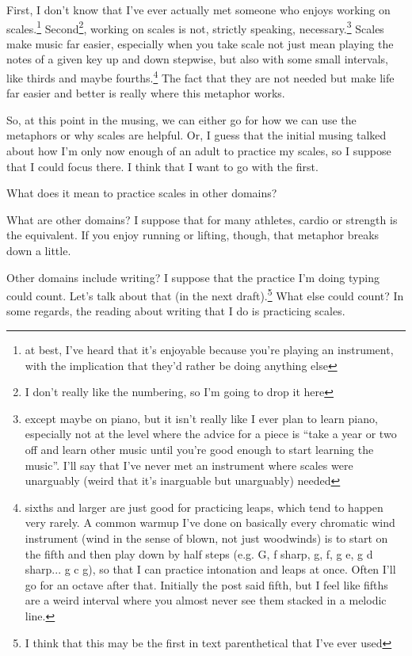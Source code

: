\documentclass[12pt]{article}[titlepage]
\newcommand{\say}[1]{``#1''}
\newcommand{\1}{\={a}}
\newcommand{\2}{\={e}}
\newcommand{\3}{\={\i}}
\newcommand{\4}{\=o}
\newcommand{\5}{\=u}
\newcommand{\6}{\={A}}
\renewcommand{\,}{\textsuperscript{,}}
\begin{document}
First, I don't know that I've ever actually met someone who enjoys working on scales.\footnote{at best, I've heard that it's enjoyable because you're playing an instrument, with the implication that they'd rather be doing anything else}
Second\footnote{I don't really like the numbering, so I'm going to drop it here}, working on scales is not, strictly speaking, necessary.\footnote{except maybe on piano, but it isn't really like I ever plan to learn piano, especially not at the level where the advice for a piece is \say{take a year or two off and learn other music until you're good enough to start learning the music}. I'll say that I've never met an instrument where scales were unarguably (weird that it's inarguable but unarguably) needed}
Scales make music far easier, especially when you take scale not just mean playing the notes of a given key up and down stepwise, but also with some small intervals, like thirds and maybe fourths.\footnote{sixths and larger are just good for practicing leaps, which tend to happen very rarely. A common warmup I've done on basically every chromatic wind instrument (wind in the sense of blown, not just woodwinds) is to start on the fifth and then play down by half steps (e.g. G, f sharp, g, f, g e, g d sharp... g c g), so that I can practice intonation and leaps at once. Often I'll go for an octave after that. Initially the post said fifth, but I feel like fifths are a weird interval where you almost never see them stacked in a melodic line.}
The fact that they are not needed but make life far easier and better is really where this metaphor works.

So, at this point in the musing, we can either go for how we can use the metaphors or why scales are helpful.
Or, I guess that the initial musing talked about how I'm only now enough of an adult to practice my scales, so I suppose that I could focus there.
I think that I want to go with the first.

What does it mean to practice scales in other domains?

What are other domains?
I suppose that for many athletes, cardio or strength is the equivalent.
If you enjoy running or lifting, though, that metaphor breaks down a little.

Other domains include writing?
I suppose that the practice I'm doing typing could count.
Let's talk about that (in the next draft).\footnote{I think that this may be the first in text parenthetical that I've ever used}
What else could count? 
In some regards, the reading about writing that I do is practicing scales.
\end{document}
